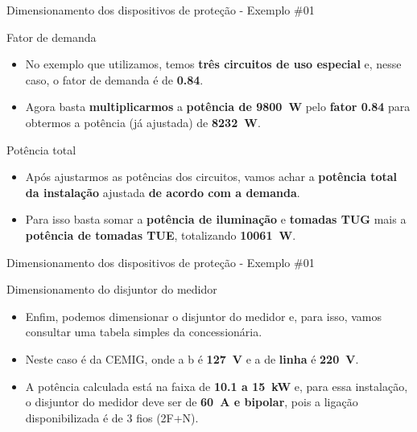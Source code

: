 \begin{frame}{Dimensionamento dos dispositivos de proteção - Exemplo \#01}
	\begin{block}{Fator de demanda}
		\begin{itemize}
			\item No exemplo que utilizamos, temos \textbf{três circuitos de uso especial }e, nesse caso, o fator de demanda é de \textbf{\num{0,84}}.
			\item Agora basta \textbf{multiplicarmos} a \textbf{potência de \SI{9800}{\watt}} pelo \textbf{fator \num{0,84}} para obtermos a potência (já ajustada) de \textbf{\SI{8232}{\watt}}.
		\end{itemize}
	\end{block}
	\begin{block}{Potência total}
		\begin{itemize}
			\item Após ajustarmos as potências dos circuitos, vamos achar a \textbf{potência total da instalação} ajustada \textbf{de acordo com a demanda}.
			\item Para isso basta somar a \textbf{potência de iluminação }e \textbf{tomadas TUG }mais a \textbf{potência de tomadas TUE}, totalizando \textbf{\SI{10061}{\watt}}.
		\end{itemize}
	\end{block}
\end{frame}


\begin{frame}{Dimensionamento dos dispositivos de proteção - Exemplo \#01}
	\begin{block}{Dimensionamento do disjuntor do medidor}
		\begin{itemize}
			\item Enfim, podemos dimensionar o disjuntor do medidor e, para isso, vamos consultar uma tabela simples da concessionária.
			\item Neste caso é da CEMIG, onde a b é \textbf{\SI{127}{\volt}} e  a de \textbf{linha} é \textbf{\SI{220}{\volt}}.
			\item A potência calculada está na faixa de \textbf{\num{10,1} a \SI{15}{\kilo\watt}} e, para essa instalação, o disjuntor do medidor deve ser de \textbf{\SI{60}{\ampere} e bipolar}, pois a ligação disponibilizada é de 3 fios (2F+N).
		\end{itemize}
	\end{block}
\end{frame}


